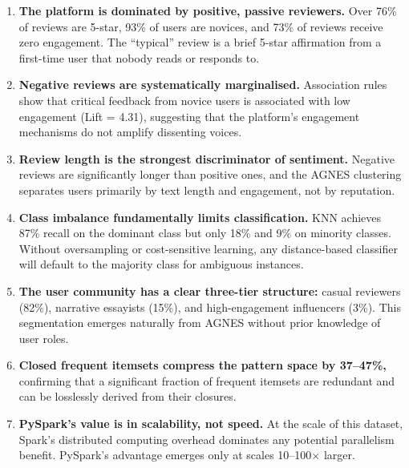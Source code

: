 \documentclass[12pt,a4paper]{article}
\begin{document}
\begin{enumerate}
    \item \textbf{The platform is dominated by positive, passive reviewers.} Over 76\% of reviews are 5-star, 93\% of users are novices, and 73\% of reviews receive zero engagement. The ``typical'' review is a brief 5-star affirmation from a first-time user that nobody reads or responds to.

    \item \textbf{Negative reviews are systematically marginalised.} Association rules show that critical feedback from novice users is associated with low engagement (Lift = 4.31), suggesting that the platform's engagement mechanisms do not amplify dissenting voices.

    \item \textbf{Review length is the strongest discriminator of sentiment.} Negative reviews are significantly longer than positive ones, and the AGNES clustering separates users primarily by text length and engagement, not by reputation.

    \item \textbf{Class imbalance fundamentally limits classification.} KNN achieves 87\% recall on the dominant class but only 18\% and 9\% on minority classes. Without oversampling or cost-sensitive learning, any distance-based classifier will default to the majority class for ambiguous instances.

    \item \textbf{The user community has a clear three-tier structure:} casual reviewers (82\%), narrative essayists (15\%), and high-engagement influencers (3\%). This segmentation emerges naturally from AGNES without prior knowledge of user roles.

    \item \textbf{Closed frequent itemsets compress the pattern space by 37--47\%,} confirming that a significant fraction of frequent itemsets are redundant and can be losslessly derived from their closures.

    \item \textbf{PySpark's value is in scalability, not speed.} At the scale of this dataset, Spark's distributed computing overhead dominates any potential parallelism benefit. PySpark's advantage emerges only at scales 10--100$\times$ larger.
\end{enumerate}

\end{document}
